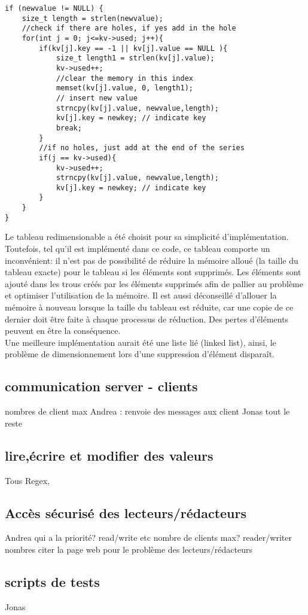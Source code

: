 \documentclass[11pt,a4paper]{article}
\begin{document}
\begin{lstlisting}
if (newvalue != NULL) {
	size_t length = strlen(newvalue);
	//check if there are holes, if yes add in the hole
	for(int j = 0; j<=kv->used; j++){
		if(kv[j].key == -1 || kv[j].value == NULL ){
			size_t length1 = strlen(kv[j].value);
			kv->used++;
			//clear the memory in this index
			memset(kv[j].value, 0, length1); 
			// insert new value
			strncpy(kv[j].value, newvalue,length); 
			kv[j].key = newkey; // indicate key
			break;
		}
		//if no holes, just add at the end of the series
		if(j == kv->used){
			kv->used++;
			strncpy(kv[j].value, newvalue,length); 
			kv[j].key = newkey; // indicate key
		}
	}
}
\end{lstlisting}

Le tableau redimensionable a été choisit pour sa simplicité d'implémentation. Toutefois, tel qu'il est implémenté dans ce code, ce tableau comporte un inconvénient: il n'est pas de possibilité de réduire la mémoire alloué (la taille du tableau exacte) pour le tableau si les éléments sont supprimés. Les éléments sont ajouté dans les trous créés par les éléments supprimés afin de pallier au problème et optimiser l'utilisation de la mémoire. Il est aussi déconseillé d'allouer la mémoire à nouveau lorsque la taille du tableau est réduite, car une copie de ce dernier doit être faite à chaque processus de réduction. Des pertes d'éléments peuvent en être la conséquence.\\
Une meilleure implémentation aurait été une liste lié (linked list), ainsi, le problème de dimensionnement lors d'une suppression d'élément disparaît.

\subsection{communication server - clients}
nombres de client max
Andrea : renvoie des messages aux client
Jonas tout le reste
\subsection{lire,écrire et modifier des valeurs}
Tous
Regex,
\subsection{Accès sécurisé des lecteurs/rédacteurs}
Andrea
qui a la priorité? read/write etc
nombre de clients max? reader/writer nombres
citer la page web pour le problème des lecteurs/rédacteurs
\subsection{scripts de tests}
Jonas
\end{document}
